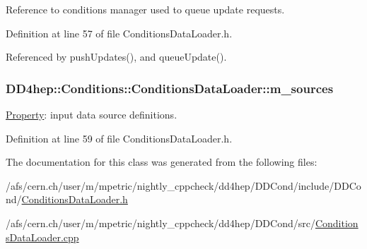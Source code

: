 Reference to conditions manager used to queue update requests. 

Definition at line 57 of file ConditionsDataLoader.h.

Referenced by pushUpdates(), and queueUpdate().\hypertarget{class_d_d4hep_1_1_conditions_1_1_conditions_data_loader_a1f27d2cb0eb76ecfb39322fb08343b31}{
\subsubsection[{m\_\-sources}]{ {\bf DD4hep::Conditions::ConditionsDataLoader::m\_\-sources}}}
\label{class_d_d4hep_1_1_conditions_1_1_conditions_data_loader_a1f27d2cb0eb76ecfb39322fb08343b31}


\hyperlink{class_d_d4hep_1_1_property}{Property}: input data source definitions. 

Definition at line 59 of file ConditionsDataLoader.h.

The documentation for this class was generated from the following files:\begin{DoxyCompactItemize}
\item 
/afs/cern.ch/user/m/mpetric/nightly\_\-cppcheck/dd4hep/DDCond/include/DDCond/\hyperlink{_conditions_data_loader_8h}{ConditionsDataLoader.h}\item 
/afs/cern.ch/user/m/mpetric/nightly\_\-cppcheck/dd4hep/DDCond/src/\hyperlink{_conditions_data_loader_8cpp}{ConditionsDataLoader.cpp}\end{DoxyCompactItemize}

